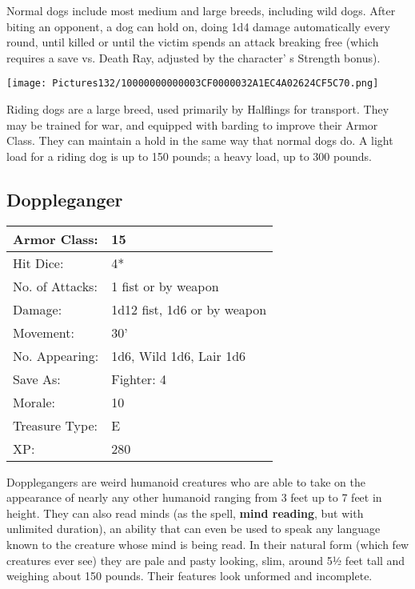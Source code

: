 \documentclass[a4paper,twoside,openany,10pt]{book}
\begin{document}
\begin{multicols}{2}
Normal dogs include most medium and large breeds, including wild dogs. After biting an opponent, a dog can hold on, doing 1d4 damage automatically every round, until killed or until the victim spends an attack breaking free (which requires a save vs. Death Ray, adjusted by the character' s Strength bonus).


\begin{center}
	\texttt{[image: Pictures132/10000000000003CF0000032A1EC4A02624CF5C70.png]}
\end{center}

Riding dogs are a large breed, used primarily by Halflings for transport. They may be trained for war, and equipped with barding to improve their Armor Class. They can maintain a hold in the same way that normal dogs do. A light load for a riding dog is up to 150 pounds; a heavy load, up to 300 pounds.

\subsection*{Doppleganger}\label{doppleganger}


\begin{tabularx}{0.48\textwidth}{@{}lX@{}}
Armor Class: & 15 \\\hline
Hit Dice: & 4* \\\hline
No. of Attacks: & 1 fist or by weapon \\\hline
Damage: & 1d12 fist, 1d6 or by weapon \\\hline
Movement: & 30' \\\hline
No. Appearing: & 1d6, Wild 1d6, Lair 1d6 \\\hline
Save As: & Fighter: 4 \\\hline
Morale: & 10 \\\hline
Treasure Type: & E \\\hline
XP: & 280 \\\hline
\end{tabularx}\medskip

Dopplegangers are weird humanoid creatures who are able to take on the appearance of nearly any other humanoid ranging from 3 feet up to 7 feet in height. They can also read minds (as the spell, \textbf{mind reading}, but with unlimited duration), an ability that can even be used to speak any language known to the creature whose mind is being read. In their natural form (which few creatures ever see) they are pale and pasty looking, slim, around 5½ feet tall and weighing about 150 pounds. Their features look unformed and incomplete.


\end{multicols}
\end{document}
